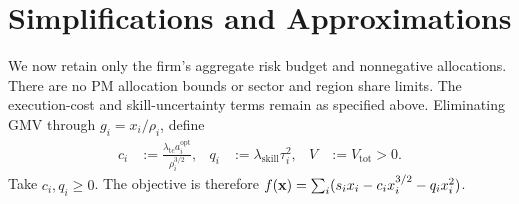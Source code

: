 \documentclass[11pt]{gappyarticle}
\begin{document}
%
% 
\section{Simplifications and Approximations}
We now retain only the firm's aggregate risk budget and nonnegative
allocations. There are no PM allocation bounds or sector and region share
limits. The execution-cost and skill-uncertainty terms remain as specified
above. Eliminating GMV through $g_i=x_i/\rho_i$, define
\begin{align}
    c_i&:=\frac{\lambda_{\mathrm{tc}}a_i^{\mathrm{opt}}}
                    {\rho_i^{3/2}},&
    q_i&:=\lambda_{\mathrm{skill}}\tau_i^2,&
    V&:=V_{\mathrm{tot}}>0.
\end{align}
Take $c_i,q_i\geq0$. The objective is therefore
$f({\mathbf{x}})=\sum_i(s_i x_i-c_i x_i^{3/2}-q_i x_i^2)$.
\end{document}
